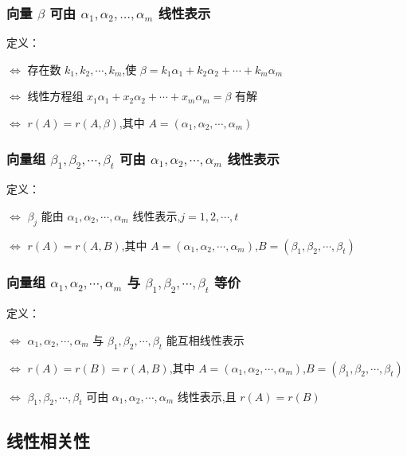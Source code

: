\documentclass[UTF8]{ctexart}
\theoremstyle{remark}
\begin{document}
	\subsubsection{\texorpdfstring{向量 $\beta$ 可由 $\alpha_1, \alpha_2, \dotsc, \alpha_m$ 线性表示}{向量 beta 可由 alpha_1, ..., alpha_m 线性表示}}
	定义：
		
	\(\Leftrightarrow\) 存在数 \(k_1,k_2,\cdots,k_m\),使 \(\beta = k_1\alpha_1 + k_2\alpha_2 + \cdots + k_m\alpha_m\)
		
	\(\Leftrightarrow\) 线性方程组 \(x_1\alpha_1 + x_2\alpha_2 + \cdots + x_m\alpha_m = \beta\) 有解
		
	\(\Leftrightarrow\) \(r(A)=r(A,\beta)\),其中 \(A = (\alpha_1,\alpha_2,\cdots,\alpha_m)\)
		
	\subsubsection{\texorpdfstring{向量组 $\beta_1,\beta_2,\cdots,\beta_t$ 可由 $\alpha_1,\alpha_2,\cdots,\alpha_m$ 线性表示}{向量组 beta_1,...,beta_t 可由 alpha_1,...,alpha_m 线性表示}}
	
	定义：
		
	\(\Leftrightarrow\) \(\beta_j\) 能由 \(\alpha_1,\alpha_2,\cdots,\alpha_m\) 线性表示,\(j = 1,2,\cdots,t\)
		
	\(\Leftrightarrow\) \(r(A)=r(A,B)\),其中 \(A = (\alpha_1,\alpha_2,\cdots,\alpha_m)\),\(B = (\beta_1,\beta_2,\cdots,\beta_t)\)
		
	\subsubsection{\texorpdfstring{向量组 $\alpha_1,\alpha_2,\cdots,\alpha_m$ 与 $\beta_1,\beta_2,\cdots,\beta_t$ 等价}{向量组 alpha_1,...,alpha_m 与 beta_1,...,beta_t 等价}}
	
	定义：
		
	\(\Leftrightarrow\) \(\alpha_1,\alpha_2,\cdots,\alpha_m\) 与 \(\beta_1,\beta_2,\cdots,\beta_t\) 能互相线性表示
		
	\(\Leftrightarrow\) \(r(A)=r(B)=r(A,B)\),其中 \(A = (\alpha_1,\alpha_2,\cdots,\alpha_m)\),\(B = (\beta_1,\beta_2,\cdots,\beta_t)\)
		
	\(\Leftrightarrow\) \(\beta_1,\beta_2,\cdots,\beta_t\) 可由 \(\alpha_1,\alpha_2,\cdots,\alpha_m\) 线性表示,且 \(r(A)=r(B)\)
		
	\subsection{线性相关性}
\end{document}
